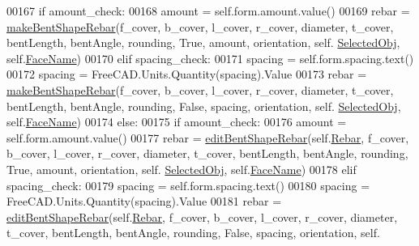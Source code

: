 \begin{DoxyCode}
00167             \textcolor{keywordflow}{if} amount\_check:
00168                 amount = self.form.amount.value()
00169                 rebar = \hyperlink{namespaceBentShapeRebar_aac46779d3e1905db5a3788917f6e2476}{makeBentShapeRebar}(f\_cover, b\_cover, l\_cover, r\_cover, diameter, 
      t\_cover, bentLength, bentAngle, rounding, \textcolor{keyword}{True}, amount, orientation, self.
      \hyperlink{classBentShapeRebar_1_1__BentShapeRebarTaskPanel_a24d363ab6c058ce4436a2b29e9c0b279}{SelectedObj}, self.\hyperlink{classBentShapeRebar_1_1__BentShapeRebarTaskPanel_a499514a87885d4c9462e3c6dc314ec9c}{FaceName})
00170             \textcolor{keywordflow}{elif} spacing\_check:
00171                 spacing = self.form.spacing.text()
00172                 spacing = FreeCAD.Units.Quantity(spacing).Value
00173                 rebar = \hyperlink{namespaceBentShapeRebar_aac46779d3e1905db5a3788917f6e2476}{makeBentShapeRebar}(f\_cover, b\_cover, l\_cover, r\_cover, diameter, 
      t\_cover, bentLength, bentAngle, rounding, \textcolor{keyword}{False}, spacing, orientation, self.
      \hyperlink{classBentShapeRebar_1_1__BentShapeRebarTaskPanel_a24d363ab6c058ce4436a2b29e9c0b279}{SelectedObj}, self.\hyperlink{classBentShapeRebar_1_1__BentShapeRebarTaskPanel_a499514a87885d4c9462e3c6dc314ec9c}{FaceName})
00174         \textcolor{keywordflow}{else}:
00175             \textcolor{keywordflow}{if} amount\_check:
00176                 amount = self.form.amount.value()
00177                 rebar = \hyperlink{namespaceBentShapeRebar_a941d005845cd497c0beb12bb8fef9171}{editBentShapeRebar}(self.\hyperlink{classBentShapeRebar_1_1__BentShapeRebarTaskPanel_aae8fd4e66d675c566d0afcee0af2341f}{Rebar}, f\_cover, b\_cover, l\_cover, 
      r\_cover, diameter, t\_cover, bentLength, bentAngle, rounding, \textcolor{keyword}{True}, amount, orientation, self.
      \hyperlink{classBentShapeRebar_1_1__BentShapeRebarTaskPanel_a24d363ab6c058ce4436a2b29e9c0b279}{SelectedObj}, self.\hyperlink{classBentShapeRebar_1_1__BentShapeRebarTaskPanel_a499514a87885d4c9462e3c6dc314ec9c}{FaceName})
00178             \textcolor{keywordflow}{elif} spacing\_check:
00179                 spacing = self.form.spacing.text()
00180                 spacing = FreeCAD.Units.Quantity(spacing).Value
00181                 rebar = \hyperlink{namespaceBentShapeRebar_a941d005845cd497c0beb12bb8fef9171}{editBentShapeRebar}(self.\hyperlink{classBentShapeRebar_1_1__BentShapeRebarTaskPanel_aae8fd4e66d675c566d0afcee0af2341f}{Rebar}, f\_cover, b\_cover, l\_cover, 
      r\_cover, diameter, t\_cover, bentLength, bentAngle, rounding, \textcolor{keyword}{False}, spacing, orientation, self.

\end{DoxyCode}
